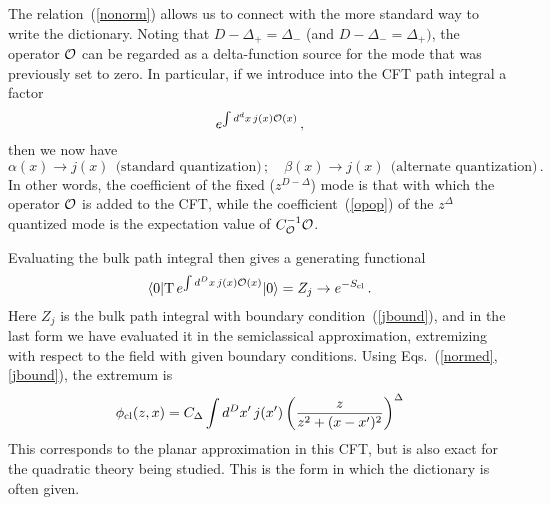 \documentclass[12pt]{article}
\begin{document}
{The relation~(\ref{nonorm}) allows us to connect with the more standard way to write the dictionary.  Noting that $D - \Delta_+ = \Delta_-$ (and $D - \Delta_- = \Delta_+)$, the operator ${\cal O}$ can be regarded as a delta-function source for the mode that was previously set to zero.  In particular, if we introduce into the CFT path integral a factor
\begin{equation}
e^{\int d^dx\, j(x) {\cal O}(x)} \,,
\end{equation}
then we now have
\begin{equation}
\alpha(x) \to j(x)\ \ \mbox{(standard quantization)}\,;\quad \beta(x) \to j(x)\ \ \mbox{(alternate quantization)}\,. \label{jbound}
\end{equation}
In other words, the coefficient of the fixed ($z^{D-\Delta}$) mode is that with which the operator $\cal O$ is added to the CFT, while the coefficient~(\ref{opop}) of the $z^\Delta$ quantized mode is the expectation value of $C_{\cal O}^{-1}\cal O$.

Evaluating the bulk path integral then gives a generating functional
\begin{equation}
\langle 0 | {\rm T}\, e^{\int d^D x\, j(x) {\cal O}(x)}|  0 \rangle = Z_j \to e^{-S_{\rm cl}}\,.
\end{equation}
Here $Z_j$ is the bulk path integral with boundary condition~(\ref{jbound}), and in the last form we have evaluated it in the semiclassical approximation, extremizing with respect to the field with given boundary conditions.  Using Eqs.~(\ref{normed}, \ref{jbound}), the extremum is
\begin{equation}
\phi_{\rm cl}(z,x) = C_{\Delta} \int d^Dx' \, j(x') \left( \frac{z}{z^2 + (x-x')^2 }\right)^{\Delta}
\end{equation}
 This corresponds to the planar approximation in this CFT, but is also exact for the quadratic theory being studied.  This is the form in which the dictionary is often given.

}
\end{document}
